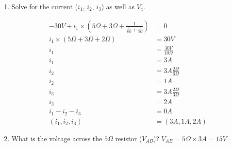 \documentclass[12pt,letterpaper,titlepage]{article}
\begin{document}
\begin{enumerate}[label=\Alph*.]
\item Solve for the current ($i_1$, $i_2$, $i_3$) as well as $V_x$.

\begin{align*}
   -30V + i_1 \times (5\Omega + 3\Omega + \frac{1}{\frac{1}{6\Omega}+\frac{1}{3\Omega}}) &= 0
\\ i_1 \times (5\Omega + 3\Omega + 2\Omega) 		&= 30V
\\ i_1												&= \frac{30V}{10\Omega}
\\ i_1												&= 3A 
\\ i_2												&= 3A \frac{2\Omega}{6\Omega}
\\ i_2												&= 1A 
\\ i_3												&= 3A \frac{2\Omega}{3\Omega}
\\ i_3												&= 2A
\\ i_1 - i_2 - i_3									&= 0A
\\ (i_1, i_2, i_3)									&= (3A, 1A, 2A)
\end{align*}

\item What is the voltage across the $5 \Omega$ resistor ($V_{AB}$)?
$V_{AB} = 5\Omega \times 3A = 15V$
 
\end{enumerate}


\begin{raggedright}



\end{raggedright}
\end{document}

